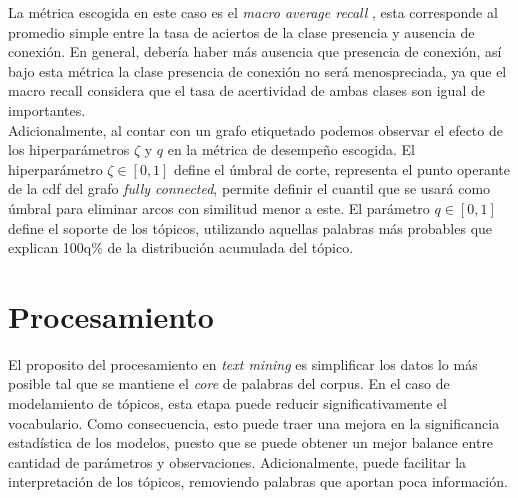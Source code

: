\documentclass[letterpaper,12pt,oneside]{book} %
\begin{document}
La métrica escogida en este caso es el \textit{macro average recall} \citep{forman2003extensive}, esta corresponde al promedio simple entre la tasa de aciertos de la clase presencia y ausencia de conexión. En general, debería haber más ausencia que presencia de conexión, así bajo esta métrica la clase presencia de conexión no será menospreciada, ya que el macro recall considera que el tasa de acertividad de ambas clases son igual de importantes.\\

Adicionalmente, al contar con un grafo etiquetado podemos observar el efecto de los hiperparámetros $\zeta$ y $q$ en la métrica de desempeño escogida. El hiperparámetro $\zeta\in[0,1]$ define el úmbral de corte, representa el punto operante de la cdf del grafo \textit{fully connected}, permite definir el cuantil que se usará como úmbral para eliminar arcos con similitud menor a este. El parámetro $q \in [0,1]$ define el soporte de los tópicos, utilizando aquellas palabras más probables que explican 100q\% de la distribución acumulada del tópico. 

\section{Procesamiento}

El proposito del procesamiento en \textit{text mining} es simplificar los datos lo más posible tal que se mantiene el \textit{core} de palabras del corpus. En el caso de modelamiento de tópicos, esta etapa puede reducir significativamente el vocabulario. Como consecuencia, esto puede traer una mejora en la significancia estadística de los modelos, puesto que se puede obtener un mejor balance entre cantidad de parámetros y observaciones. Adicionalmente, puede facilitar la interpretación de los tópicos, removiendo palabras que aportan poca información.\\
\end{document}
